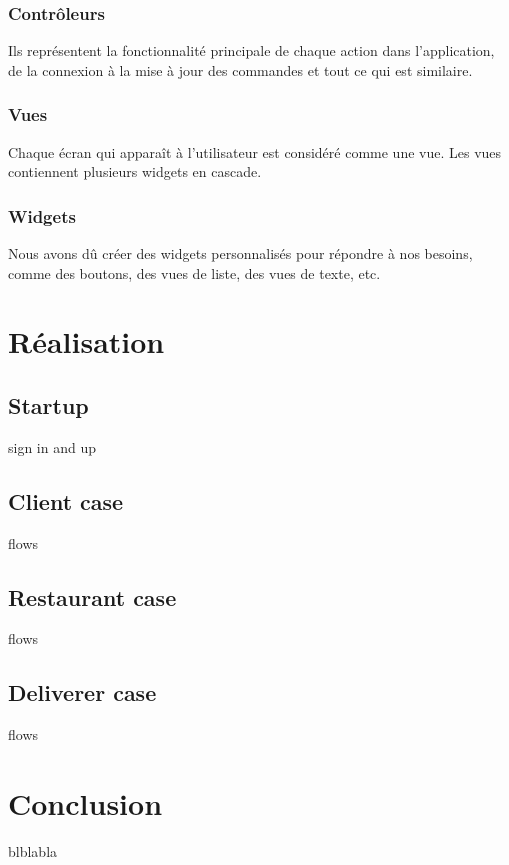 \documentclass[french, a4paper, french]{report}
\begin{document}
		\subsection{Contrôleurs} Ils représentent la fonctionnalité principale de chaque action dans l'application, de la connexion à la mise à jour des commandes et tout ce qui est similaire.
		\subsection{Vues} Chaque écran qui apparaît à l'utilisateur est considéré comme une vue. Les vues contiennent plusieurs widgets en cascade.
		\subsection{Widgets} Nous avons dû créer des widgets personnalisés pour répondre à nos besoins, comme des boutons, des vues de liste, des vues de texte, etc.
		
\newpage
\chapter{Réalisation}
	\section{Startup} sign in and up
	\section{Client case} flows
	\section{Restaurant case} flows
	\section{Deliverer case} flows

\newpage
\chapter*{Conclusion}
blblabla

\newpage
\begin{thebibliography}{300}
\end{thebibliography}
\end{document}
